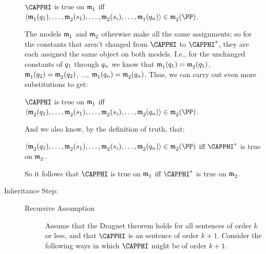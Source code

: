 \begin{PROOF}
\begin{description}
\begin{cenumerate}
\begin{center}
$\CAPPHI$ is true on $\mathfrak{m^{\mathrm{}}_{\mathrm{1}}}$ iff $\langle\As{}{1}(\variable{q}_{\integer{1}}),\ldots,\As{}{2}(\variable{s}_1),\ldots,\As{}{2}(\variable{s}_{\integer{i}}),\ldots,\As{}{1}(\variable{q}_{\integer{n}})\rangle\in\As{}{2}(\PP)$.
\end{center}
The models $\mathfrak{m^{\mathrm{}}_{\mathrm{1}}}$ and $\mathfrak{m^{\mathrm{}}_{\mathrm{2}}}$ otherwise make all the same assignments; so
for the constants that aren't changed from $\CAPPHI$ to $\CAPPHI^*$, they are each assigned the same object on both models. I.e., for the unchanged constants of $q_{1}$ through $q_{n}$ we know that $\mathfrak{m^{\mathrm{}}_{\mathrm{1}}}(q_{1})=\mathfrak{m^{\mathrm{}}_{\mathrm{2}}}(q_{1})$, $\mathfrak{m^{\mathrm{}}_{\mathrm{1}}}(q_{2})=\mathfrak{m^{\mathrm{}}_{\mathrm{2}}}(q_{2})$, $\ldots$,  $\mathfrak{m^{\mathrm{}}_{\mathrm{1}}}(q_{n})=\mathfrak{m^{\mathrm{}}_{\mathrm{2}}}(q_{n})$.  Thus, we can carry out even more substitutions to get: 
\begin{center}
$\CAPPHI$ is true on $\mathfrak{m^{\mathrm{}}_{\mathrm{1}}}$ iff $\langle\As{}{2}(\variable{q}_{\integer{1}}),\ldots,\As{}{2}(\variable{s}_1),\ldots,\As{}{2}(\variable{s}_{\integer{i}}),\ldots,\As{}{2}(\variable{q}_{\integer{n}})\rangle\in\As{}{2}(\PP)$.
\end{center}
And we also know, by the definition of truth, that:
\begin{center} $\langle\As{}{2}(\variable{q}_{\integer{1}}),\ldots,\As{}{2}(\variable{s}_1),\ldots,\As{}{2}(\variable{s}_{\integer{i}}),\ldots,\As{}{2}(\variable{q}_{\integer{n}})\rangle\in\As{}{2}(\PP)$ iff $\CAPPHI^*$ is true on $\mathfrak{m^{\mathrm{}}_{\mathrm{2}}}$.
\end{center}
So it follows that $\CAPPHI$ is true on $\mathfrak{m^{\mathrm{}}_{\mathrm{1}}}$ iff $\CAPPHI^*$ is true on $\mathfrak{m^{\mathrm{}}_{\mathrm{2}}}$.
\end{cenumerate}
\item[Inheritance Step:] \hfill 
\begin{description}
\item[Recursive Assumption] Assume that the Dragnet theorem holds for all \GQL{} sentences of order $k$ or less, and that $\CAPPHI$ is an \GQL{} sentence of order $k+1$.  Consider the following ways in which $\CAPPHI$ might be of order $k+1$.


\end{description}
\end{description}
\end{PROOF}
